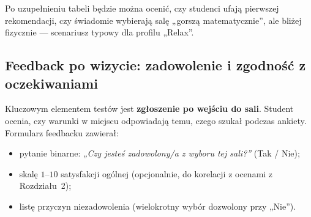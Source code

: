 \documentclass[14pt,a4paper]{extarticle}
\begin{document}
\begin{table}[H]
    \centering
    \caption{Zestawienie wyborów sal po wyszukiwaniu.}
    \label{tab:wybory}
\end{table}

Po uzupełnieniu tabeli będzie można ocenić, czy studenci ufają pierwszej rekomendacji, czy świadomie wybierają salę „gorszą matematycznie”, ale bliżej fizycznie --- scenariusz typowy dla profilu „Relax”.

\subsection{Feedback po wizycie: zadowolenie i zgodność z oczekiwaniami}
Kluczowym elementem testów jest \textbf{zgłoszenie po wejściu do sali}. Student ocenia, czy warunki w miejscu odpowiadają temu, czego szukał podczas ankiety. Formularz feedbacku zawierał:
\begin{itemize}
    \item pytanie binarne: \emph{„Czy jesteś zadowolony/a z wyboru tej sali?”} (Tak / Nie);
    \item skalę $1$--$10$ satysfakcji ogólnej (opcjonalnie, do korelacji z ocenami z Rozdziału~2);
    \item listę przyczyn niezadowolenia (wielokrotny wybór dozwolony przy „Nie”).
\end{itemize}

\vspace{0.4cm}
\end{document}
